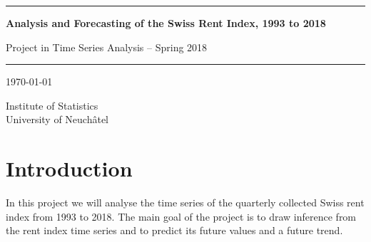 \documentclass[11pt,a4paper]{article}
\begin{document}

\thispagestyle{empty}  %

\begin{center}

\vspace*{4cm}

\noindent\rule{15cm}{0.4pt}

\vspace*{2cm}

\Huge{\textbf{Analysis and Forecasting of the Swiss Rent Index, 1993 to 2018}}

\vspace{1cm}

\LARGE{Project in Time Series Analysis -- Spring 2018}

\vspace{2cm}

\noindent\rule{15cm}{0.4pt}

\vfill

\large{
    \today\\

}
\vspace{2cm}

\large{Institute of Statistics \\University of Neuchâtel}

\vspace{2cm}

\end{center}


\newpage



\thispagestyle{empty}
\tableofcontents
\clearpage
{}
\newpage



\section{Introduction}

In this project we will analyse the time series of the quarterly collected Swiss rent index from 1993 to 2018.
The main goal of the project is to draw inference from the rent index time series and to predict its future values and a future trend.
\end{document}
